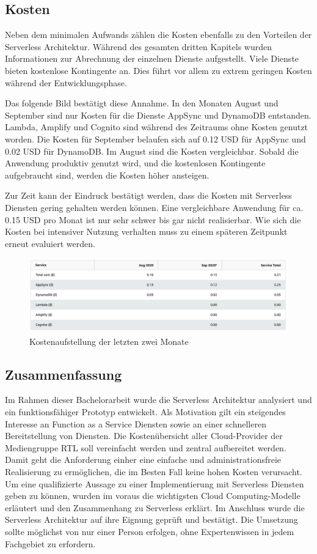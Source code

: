 \subsection{Kosten}
Neben dem minimalen Aufwands zählen die Kosten ebenfalls zu den Vorteilen der Serverless Architektur.
Während des gesamten dritten Kapitels wurden Informationen zur Abrechnung der einzelnen Dienste aufgestellt.
Viele Dienste bieten kostenlose Kontingente an.
Dies führt vor allem zu extrem geringen Kosten während der Entwicklungsphase.

Das folgende Bild bestätigt diese Annahme.
In den Monaten August und September sind nur Kosten für die Dienste AppSync und DynamoDB entstanden.
Lambda, Amplify und Cognito sind während des Zeitraums ohne Kosten genutzt worden.
Die Kosten für September belaufen sich auf 0.12 USD für AppSync und 0.02 USD für DynamoDB.
Im August sind die Kosten vergleichbar.
Sobald die Anwendung produktiv genutzt wird, und die kostenlosen Kontingente aufgebraucht sind, werden die Kosten höher ansteigen.

Zur Zeit kann der Eindruck bestätigt werden, dass die Kosten mit Serverless Diensten gering gehalten werden können.
Eine vergleichbare Anwendung für ca. 0.15 USD pro Monat ist nur sehr schwer bis gar nicht realisierbar.
Wie sich die Kosten bei intensiver Nutzung verhalten muss zu einem späteren Zeitpunkt erneut evaluiert werden.
\\
\begin{figure}[htbp]
    \centering
    \includegraphics[width=1.0\textwidth]{50-Implementierung/Kosten.png}
    \caption{Kostenaufstellung der letzten zwei Monate}
    \label{fig:meine-grafik}
\end{figure}
\clearpage

\subsection{Zusammenfassung}
Im Rahmen dieser Bachelorarbeit wurde die Serverless Architektur analysiert und ein funktionsfähiger Prototyp entwickelt.
Als Motivation gilt ein steigendes Interesse an Function as a Service Diensten sowie an einer schnelleren Bereitstellung von Diensten.
Die Kostenübersicht aller Cloud-Provider der Mediengruppe RTL soll vereinfacht werden und zentral aufbereitet werden.
Damit geht die Anforderung einher eine einfache und administrationsfreie Realisierung zu ermöglichen, die im Besten Fall keine hohen Kosten verursacht.
Um eine qualifizierte Aussage zu einer Implementierung mit Serverless Diensten geben zu können, wurden im voraus die wichtigsten Cloud Computing-Modelle erläutert und den Zusammenhang zu Serverless erklärt.
Im Anschluss wurde die Serverless Architektur auf ihre Eignung geprüft und bestätigt.
Die Umsetzung sollte möglichst von nur einer Person erfolgen, ohne Expertenwissen in jedem Fachgebiet zu erfordern.

